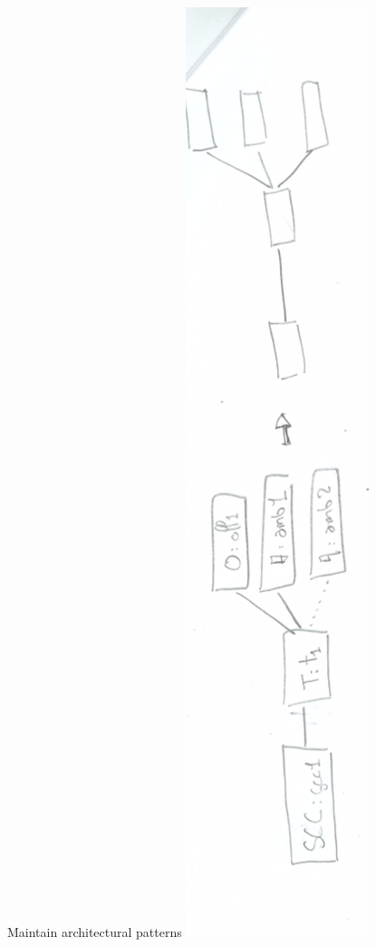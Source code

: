 \documentclass[notes]{beamer}
\begin{document}
\begin{frame}{Maintain architectural patterns}
\includegraphics[angle=-90, scale=0.4]{cas-maintain-pattern}
\end{frame}
\end{document}
